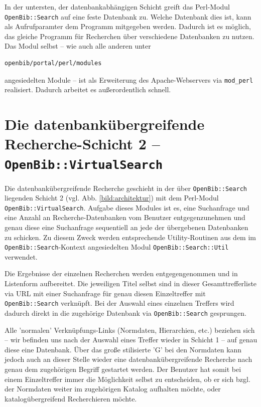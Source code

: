 \documentclass[11pt, twoside, a4paper, BCOR8mm, DIV12, bibtotoc,idxtotoc]{scrbook}
\begin{document}
In der untersten, der datenbankabhängigen Schicht greift das
Perl-Modul \texttt{OpenBib::Search} auf eine feste Datenbank zu.
Welche Datenbank dies ist, kann als Aufrufparamter dem Programm
mitgegeben werden. Dadurch ist es möglich, das gleiche Programm für
Recherchen über ver\-schie\-de\-ne Daten\-banken zu nutzen. Das Modul
selbst -- wie auch alle anderen unter
\begin{verbatim}
openbib/portal/perl/modules
\end{verbatim}
angesiedelten Module -- ist als Erweiterung des Apache-Webservers via
\texttt{mod\_perl} realisiert.  Dadurch arbeitet es außer\-ordentlich
schnell.


\section{Die datenbankübergreifende Recherche-Schicht 2 -- \texttt{OpenBib::VirtualSearch}}

Die datenbankübergreifende Recherche geschieht in der über
\texttt{OpenBib::Search} liegenden Schicht 2 (vgl. Abb.
\ref{bild:architektur}) mit dem Perl-Modul
\texttt{OpenBib::VirtualSearch}. Aufgabe dieses Modules ist es, eine
Suchanfrage und eine Anzahl an Recherche-Datenbanken vom Benutzer
entgegen\-zuneh\-men und genau diese eine Suchanfrage sequentiell an
jede der übergebenen Datenbanken zu schicken. Zu diesem Zweck werden
entsprechende Utility-Routinen aus dem im
\texttt{OpenBib::Search}-Kontext angesiedelten Modul
\texttt{OpenBib::Search::Util} verwendet.

Die Ergebnisse der einzelnen Recherchen werden entgegengenommen und in
Listenform auf\-be\-rei\-tet. Die jeweiligen Titel selbst sind in dieser
Gesamttrefferliste via URL mit einer Suchanfrage für genau diesen
Einzeltreffer mit \texttt{OpenBib::Search} verknüpft. 
Bei der
Auswahl eines einzelnen Treffers wird dadurch direkt in die
zugehörige Datenbank via \texttt{OpenBib::Search} gesprungen. 

Alle 'normalen' Verknüpfungs-Links (Normdaten, Hierarchien, etc.)
beziehen sich -- wir befinden uns nach der Auswahl eines Treffer wieder in
Schicht 1 -- auf genau diese eine Datenbank. Über das große
stilisierte 'G' bei den Normdaten kann jedoch auch an dieser Stelle
wieder eine datenbankübergreifende Recherche nach genau dem
zugehörigen Begriff gestartet werden. Der Benutzer hat somit bei
einem Einzeltreffer immer die Möglichkeit selbst zu entscheiden, ob
er sich bzgl. der Normdaten weiter im zugehörigen Katalog aufhalten
möchte, oder katalogübergreifend Recherchieren möchte.
\end{document}

